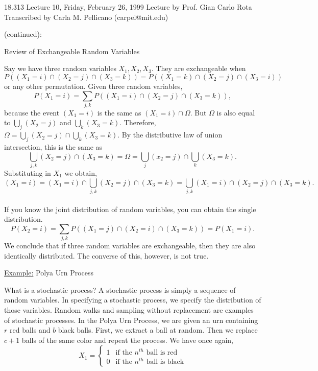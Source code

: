{\Large 18.313 Lecture 10, Friday, February 26, 1999}\newline
{\large Lecture by Prof. Gian Carlo Rota}\newline
Transcribed by Carla M. Pellicano (carpel@mit.edu)\newline

 (continued):

Review of Exchangeable Random Variables

Say we have three random variables $X_1, X_2, X_3.$  They are exchangeable when
$$P((X_1= i) \cap (X_2 = j) \cap (X_3 = k)) = P((X_1 = k) \cap (X_2 = j) \cap (X_3 = i))$$
or any other permutation.  Given three random variables, 
$$P(X_1 = i) = \sum\limits_{j,k} P((X_1 = i) \cap (X_2 = j) \cap (X_3 = k)),$$
because the event $(X_1 = i)$ is the same as $(X_1 = i) \cap \Omega$.  But $\Omega$ is also equal to $\bigcup\limits_{j} (X_2 = j)$ and $\bigcup\limits_{k} (X_3 = k)$.  Therefore, $\Omega = \bigcup\limits_{j} (X_2 = j) \cap \bigcup\limits_{k} (X_3 = k)$.  By the distributive law of union intersection, this is the same as
$$
\bigcup\limits_{j,k}  (X_2 = j) \cap (X_3 = k) = \Omega = \bigcup\limits_{j}  (x_2 = j) \cap \bigcup\limits_{k}  (X_3 = k).
$$
Substituting in $X_1$ we obtain, 
$$
(X_1 = i) = (X_1 = i) \cap \bigcup\limits_{j,k} (X_2 = j) \cap (X_3 = k) = \bigcup\limits_{j,k} (X_1 = i) \cap (X_2 = j) \cap (X_3 = k).
$$
\\
If you know the joint distribution of random variables, you can obtain the single distribution. 
$$
P(X_2 = i) = \sum\limits_{j,k} P((X_1 = j) \cap (X_2 = i) \cap (X_3 = k)) = P(X_1 = i).
$$
We conclude that if three random variables are exchangeable, then they are also identically distributed.  The converse of this, however, is not true.

\underline {Example:} Polya Urn Process

What is a stochastic process?  A stochastic process is simply a sequence of random variables.  In specifying a stochastic process, we specify the distribution of those variables.  Random walks and sampling without replacement are examples of stochastic processes.  In the Polya Urn Process, we are given an urn containing $r$ red balls and $b$ black balls.  First, we extract a ball at random.  Then we replace $c+1$ balls of the same color and repeat the process.  We have once again, 
$${X_1} = \left\{ \begin{array} {ll} 1 &\mbox{if the $n^{th}$ ball is red}\\ 0 & \mbox{if the $n^{th}$ ball is black} \end{array} \right. $$

